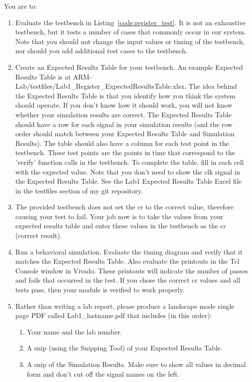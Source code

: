 You are to:
\begin{enumerate}
\item Evaluate the testbench in Listing~\ref{code:register_test}.  It is not an exhaustive testbench, but it tests a number of cases that commonly occur in our system.  Note that you should not change the input values or timing of the testbench, nor should you add additional test cases to the testbench.
\item Create an Expected Results Table for your testbench.  An example Expected Results Table is at ARM-Lab/testfiles/Lab1\_Register\_ExpectedResultsTable.xlsx.  The idea behind the Expected Results Table is that you identify how you think the system should operate.  If you don't know how it should work, you will not know whether your simulation results are correct.  The Expected Results Table should have a row for each signal in your simulation results (and the row order should match between your Expected Results Table and Simulation Results).  The table should also have a column for each test point in the testbench.  These test points are the points in time that correspond to the 'verify' function calls in the testbench.  To complete the table, fill in each cell with the expected value.  Note that you don't need to show the clk signal in the Expected Results Table.  See the Lab1 Expected Results Table Excel file in the testfiles section of my git repository.
\item The provided testbench does not set the cr to the correct value, therefore causing your test to fail.  Your job now is to take the values from your expected results table and enter these values in the testbench as the cr (correct result).
\item Run a behavioral simulation.  Evaluate the timing diagram and verify that it matches the Expected Results Table.  Also evaluate the printouts in the Tcl Console window in Vivado.  These printouts will indicate the number of passes and fails that occurred in the test.  If you chose the correct cr values and all tests pass, then your module is verified to work properly.   
\item Rather than writing a lab report, please produce a landscape mode single page PDF called Lab1\_lastname.pdf that includes (in this order):
	\begin{enumerate}
		\item Your name and the lab number.
		\item A snip (using the Snipping Tool) of your Expected Results Table.
		\item A snip of the Simulation Results.  Make sure to show all values in decimal form and don't cut off the signal names on the left.  

\end{enumerate}
\end{enumerate}
